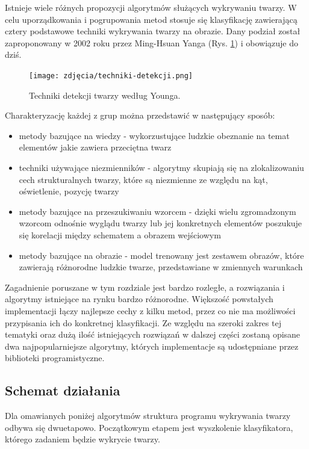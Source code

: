 Istnieje wiele różnych propozycji algorytmów służących wykrywaniu twarzy. W celu uporządkowania i pogrupowania metod stosuje się klasyfikację zawierającą cztery podstawowe techniki wykrywania twarzy na obrazie. Dany podział został zaproponowany w 2002 roku przez Ming-Hsuan Yanga (Rys. \ref{fig:detectionMethods}) i obowiązuje do dziś.

\begin{figure}[h]
	\centering
	\texttt{[image: zdjęcia/techniki-detekcji.png]}
	\caption{Techniki detekcji twarzy według Younga.} 
	\label{fig:detectionMethods}
\end{figure}

Charakteryzację każdej z grup \cite{Yang} można przedstawić w następujący sposób:
\begin{itemize}
    \item metody bazujące na wiedzy - wykorzustujące ludzkie obeznanie na temat elementów jakie zawiera przeciętna twarz
    \item techniki używające niezmienników - algorytmy skupiają się na zlokalizowaniu cech strukturalnych twarzy, które są niezmienne ze względu na kąt, oświetlenie, pozycję twarzy
    \item metody bazujące na przeszukiwaniu wzorcem - dzięki wielu zgromadzonym wzorcom odnośnie wyglądu twarzy lub jej konkretnych elementów poszukuje się korelacji między schematem a obrazem wejściowym
    \item metody bazujące na obrazie - model trenowany jest zestawem obrazów, które zawierają różnorodne ludzkie twarze, przedstawiane w zmiennych warunkach
\end{itemize}

Zagadnienie poruszane w tym rozdziale jest bardzo rozległe, a rozwiązania i algorytmy istniejące na rynku bardzo różnorodne. Większość powstałych implementacji łączy najlepsze cechy z kilku metod, przez co nie ma możliwości przypisania ich do konkretnej klasyfikacji. Ze względu na szeroki zakres tej 
tematyki oraz dużą ilość istniejących rozwiązań w dalszej części zostaną opisane dwa najpopularniejsze algorytmy, których implementacje są udostępniane przez biblioteki programistyczne.

\subsection{Schemat działania}
Dla omawianych poniżej algorytmów struktura programu wykrywania twarzy odbywa się dwuetapowo. Początkowym etapem jest wyszkolenie klasyfikatora, którego zadaniem będzie wykrycie twarzy. 

